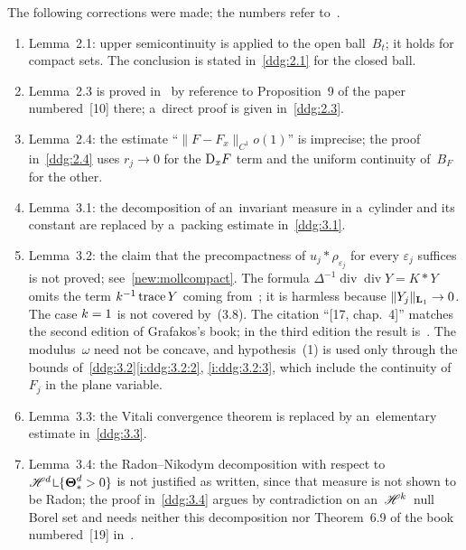 \documentclass[a4paper,twoside,leqno]{article}
\begin{document}
\begin{remark}
    \label{rem:errors}
    The following corrections were made; the numbers refer to~\cite{DePhilippis2018}.
    \begin{enumerate}
        \item Lemma~2.1: upper semicontinuity is applied to the open ball~$B_t$; it holds for
        compact sets. The conclusion is stated in~\ref{ddg:2.1} for the closed ball.
        \item Lemma~2.3 is proved in~\cite[p.~1130]{DePhilippis2018} by reference to Proposition~9 of the paper numbered~[10] there; a~direct proof
        is given in~\ref{ddg:2.3}.
        \item Lemma~2.4: the estimate ``$\|F - F_x\|_{C^1} o(1)$'' is imprecise; the proof
        in~\ref{ddg:2.4} uses $r_j \to 0$ for the $\mathrm{D}_x F$ term and the uniform continuity
        of~$B_F$ for the other.
        \item Lemma~3.1: the decomposition of an~invariant measure in a~cylinder and its constant
        are replaced by a~packing estimate in~\ref{ddg:3.1}.
        \item Lemma~3.2: the claim that the precompactness of $u_j * \rho_{\varepsilon_j}$ for
        every $\varepsilon_j$ suffices is not proved; see~\ref{new:mollcompact}. The formula
        $\Delta^{-1} \operatorname{div} \operatorname{div} Y = K * Y$ omits the term
        $k^{-1} \operatorname{trace} Y$ coming from~\cite[(4.9)]{Gilbarg2001a}; it is harmless because
        $\|Y_j\|_{\mathbf{L}_{1}} \to 0$. The case $k = 1$ is not covered by~(3.8). The citation
        ``[17, chap.~4]'' matches the second edition of Grafakos's book; in the third edition the
        result is~\cite[Theorem~5.3.3]{Grafakos2014}. The modulus~$\omega$ need not be concave, and
        hypothesis~(1) is used only through the bounds of~\ref{ddg:3.2}\ref{i:ddg:3.2:2},
        \ref{i:ddg:3.2:3}, which include the continuity of~$F_j$ in the plane variable.
        \item Lemma~3.3: the Vitali convergence theorem is replaced by an~elementary estimate
        in~\ref{ddg:3.3}.
        \item Lemma~3.4: the Radon--Nikodym decomposition with respect to $\HM^d \restrict \{
        \density_*^d > 0 \}$ is not justified as written, since that measure is not shown to be
        Radon; the proof in~\ref{ddg:3.4} argues by contradiction on an~$\mathscr{H}^{k}$~null Borel
        set and needs neither this decomposition nor Theorem~6.9 of the book numbered~[19] in~\cite[p.~1137]{DePhilippis2018}.

\end{enumerate}
\end{remark}
\end{document}
